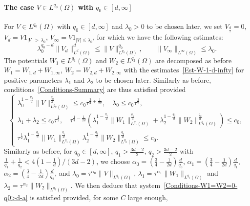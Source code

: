 \documentclass[AHL,Unicode,longabstracts]{cedram}
\newcommand*\ds{\displaystyle}
\renewcommand{\leq}{\leqslant}
\begin{document}
\paragraph{The case $V \in L^{q_0}(\Omega)$ with $q_0 \in [d,\infty]$}
For $V \in L^{q_0}(\Omega)$ with $q_0 \in [d, \infty]$ and $\lambda_0>0$ to be chosen later, we set $V_{\frac{d}{2}} = 0$, $V_d = V 1_{|V|\,>\,\lambda_0}$, $V_\infty = V 1_{|V| \leq \lambda_0}$, for which we have the following estimates:
\[
\lambda_0^{q_0-d} \| V_{d}\|_{L^{d}(\Omega)}^{d} \leq \| V \|_{L^{q_0}(\Omega)}^{q_0},
\qquad
\| V_{\infty} \|_{L^\infty(\Omega)} \leq \lambda_0.
\]
The potentials $W_1 \in L^{q_1}(\Omega)$ and $W_2 \in L^{q_2}(\Omega)$ are decomposed as before $W_1 = W_{1,d} + W_{1, \infty}$, $W_2 = W_{2,d} + W_{2, \infty}$ with the estimates~\eqref{Est-W-1-d-infty} for positive parameters $\lambda_1$ and $\lambda_2$ to be chosen later. Similarly as before, conditions~\eqref{Conditions-Summary} are thus satisfied provided
\begin{equation}\label{Conditions-W1=W2=0-q0>d-a}
\left\{
\begin{array}{l}
\ds
\lambda_0^{1-\frac{q_0}{d}} \| V \|_{L^{q_0}(\Omega)}^{\frac{q_0}{d}} \leq c_0 \tau^{\frac{3}{4}+\frac{1}{2d}},
\quad
\lambda_0 \leq c_0 \tau^{\frac{3}{2}},
\\[0.15em]
\ds
\lambda_1 + \lambda_2 \leq c_0 \tau^{\frac{1}{2}}, \quad
\tau^{\frac{1}{4}-\frac{1}{2d}} \left(\lambda_1^{1- \frac{q_1}{d}} \| W_{1} \|_{L^{q_1}(\Omega)}^{ \frac{q_1}{d}} + \lambda_2^{1- \frac{q_2}{d}} \| W_{2} \|_{L^{q_2}(\Omega)}^{ \frac{q_2}{d}}\right) \leq c_0,
\\[0.15em]
\ds \tau^{\frac{1}{2}} \lambda_1^{1- \frac{q_1}{d}} \| W_{1} \|_{L^{q_1}(\Omega)}^{ \frac{q_1}{d}} \lambda_2^{1- \frac{q_2}{d}} \| W_{2} \|_{L^{q_2}(\Omega)}^{ \frac{q_2}{d}} \leq c_0.
\end{array}\right.
\end{equation}
Similarly as before, for $q_0 \in [d, \infty]$, $q_1 > \frac{3d-2}{2} $, $q_2 > \frac{3d-2}{2} $ with $\frac{1}{q_1} +\frac{1}{q_2} < 4(1-\frac{1}{d})/(3d -2)$, we choose $\alpha_0 = (\frac{3}{4} - \frac{1}{2d})\frac{d}{q_0}$, $\alpha_1 = (\frac{3}{4} - \frac{1}{2d}) \frac{d}{q_1}$, $\alpha_2 = (\frac{3}{4} - \frac{1}{2d}) \frac{d}{q_2}$, and $\lambda_0 = \tau^{\alpha_0} \| V\|_{L^{q_0}(\Omega)}$, $\lambda_1 = \tau^{\alpha_1} \| W_1 \|_{L^{q_1}(\Omega)}$ and $\lambda_2 = \tau^{\alpha_2} \| W_2 \|_{L^{q_2}(\Omega)}$. We then deduce that system~\eqref{Conditions-W1=W2=0-q0>d-a} is satisfied provided, for some $C$ large enough,
\end{document}

